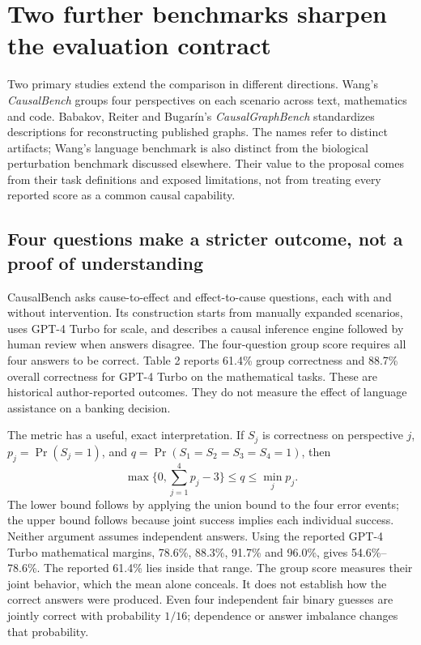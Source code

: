 \section{Two further benchmarks sharpen the evaluation contract}
\label{exec14:l7-frontier}

Two primary studies extend the comparison in different directions. Wang's
\emph{CausalBench} groups four perspectives on each scenario across text,
mathematics and code. Babakov, Reiter and Bugarín's \emph{CausalGraphBench}
standardizes descriptions for reconstructing published graphs. The names
refer to distinct artifacts; Wang's language benchmark is also distinct from
the biological perturbation benchmark discussed elsewhere. Their value to
the proposal comes from their task definitions and exposed limitations,
not from treating every reported score as a common causal capability.
\citep{exec14_l7_causalbench,exec14_l7_causalgraphbench}

\subsection{Four questions make a stricter outcome, not a proof of understanding}

CausalBench asks cause-to-effect and effect-to-cause questions, each with and
without intervention. Its construction starts from manually expanded
scenarios, uses GPT-4 Turbo for scale, and describes a causal inference engine
followed by human review when answers disagree. The four-question group
score requires all four answers to be correct. Table 2 reports 61.4\% group
correctness and 88.7\% overall correctness for GPT-4 Turbo on the mathematical
tasks. These are historical author-reported outcomes. They do not measure
the effect of language assistance on a banking decision.
\citep{exec14_l7_causalbench}

The metric has a useful, exact interpretation. If \(S_j\) is correctness
on perspective \(j\), \(p_j=\Pr(S_j=1)\), and
\(q=\Pr(S_1=S_2=S_3=S_4=1)\), then
\[
       \max\{0,\textstyle\sum_{j=1}^4p_j-3\}
       \leq q\leq\min_j p_j.
\]
The lower bound follows by applying the union bound to the four error
events; the upper bound follows because joint success implies each
individual success. Neither argument assumes independent answers. Using
the reported GPT-4 Turbo mathematical margins, 78.6\%, 88.3\%, 91.7\%
and 96.0\%, gives 54.6\%--78.6\%. The reported 61.4\% lies inside that
range. The group score measures their joint behavior, which the mean
alone conceals. It does not establish how the correct answers were produced.
Even four independent fair binary guesses are jointly correct with probability
\(1/16\); dependence or answer imbalance changes that probability.
\citep{exec14_l7_frontier_exact}

